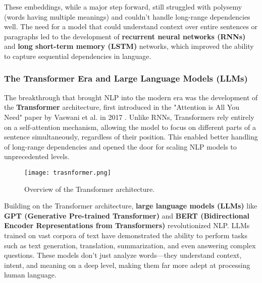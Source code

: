 These embeddings, while a major step forward, still struggled with polysemy (words having multiple meanings) and couldn’t handle long-range dependencies well.
The need for a model that could understand context over entire sentences or paragraphs led to the development of \textbf{recurrent neural networks (RNNs)} \cite{Rumelhart1986LearningIR} and \textbf{long short-term memory (LSTM)} \cite{hochreiter1997long} networks, which improved the ability to capture sequential dependencies in language.

\subsubsection{ The Transformer Era and Large Language Models (LLMs)}

The breakthrough that brought NLP into the modern era was the development of the \textbf{Transformer} architecture, first introduced in the "Attention is All You Need" paper by Vaswani et al. in 2017 \cite{vaswani2017attention}. Unlike RNNs, Transformers rely entirely on a self-attention mechanism, allowing the model to focus on different parts of a sentence simultaneously, regardless of their position.
This enabled better handling of long-range dependencies and opened the door for scaling NLP models to unprecedented levels.

\begin{figure}[h]
    \centering
    \texttt{[image: trasnformer.png]}
    \caption{Overview of the Transformer architecture.}
    \vspace{0.1cm}
    \label{fig:transformer}
\end{figure}

Building on the Transformer architecture, \textbf{large language models (LLMs)} like \textbf{GPT (Generative Pre-trained Transformer)}\cite{radford2018improving} and \textbf{BERT (Bidirectional Encoder Representations from Transformers)}\cite{devlin2018bert} revolutionized NLP. LLMs trained on vast corpora of text have demonstrated the ability to perform tasks such as text generation, translation, summarization, and even answering complex questions.
These models don’t just analyze words—they understand context, intent, and meaning on a deep level, making them far more adept at processing human language.

